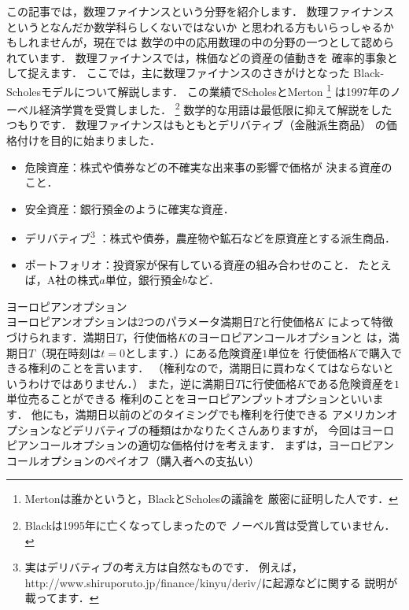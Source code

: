 この記事では，数理ファイナンスという分野を紹介します．
数理ファイナンスというとなんだか数学科らしくないではないか
と思われる方もいらっしゃるかもしれませんが，現在では
数学の中の応用数理の中の分野の一つとして認められています．
数理ファイナンスでは，株価などの資産の値動きを
確率的事象として捉えます．
ここでは，主に数理ファイナンスのさきがけとなった
Black-Scholesモデルについて解説します．
この業績でScholesとMerton
\footnote{Mertonは誰かというと，BlackとScholesの議論を
厳密に証明した人です．}
は1997年のノーベル経済学賞を受賞しました．
\footnote{Blackは1995年に亡くなってしまったので
ノーベル賞は受賞していません．}
数学的な用語は最低限に抑えて解説をしたつもりです．
数理ファイナンスはもともとデリバティブ（金融派生商品）
の価格付けを目的に始まりました．
\begin{itemize}
 \item 危険資産：株式や債券などの不確実な出来事の影響で価格が
       決まる資産のこと．
 \item 安全資産：銀行預金のように確実な資産．
 \item デリバティブ\footnote{実はデリバティブの考え方は自然なものです．
       例えば，
       http://www.shiruporuto.jp/finance/kinyu/deriv/に起源などに関する
       説明が載ってます．}
       ：株式や債券，農産物や鉱石などを原資産とする派生商品．
 \item ポートフォリオ：投資家が保有している資産の組み合わせのこと．
       たとえば，A社の株式$a$単位，銀行預金$b$など．
\end{itemize}
\kikueg ヨーロピアンオプション\\
ヨーロピアンオプションは2つのパラメータ満期日$T$と行使価格$K$
によって特徴づけられます．満期日$T$，行使価格$K$のヨーロピアンコールオプションと
は，満期日$T$（現在時刻は$t=0$とします．）にある危険資産$1$単位を
行使価格$K$で購入できる権利のことを言います．
（権利なので，満期日に買わなくてはならないというわけではありません．）
また，逆に満期日$T$に行使価格$K$である危険資産を$1$単位売ることができる
権利のことをヨーロピアンプットオプションといいます．
他にも，満期日以前のどのタイミングでも権利を行使できる
アメリカンオプションなどデリバティブの種類はかなりたくさんありますが，
今回はヨーロピアンコールオプションの適切な価格付けを考えます．
まずは，ヨーロピアンコールオプションのペイオフ（購入者への支払い）
